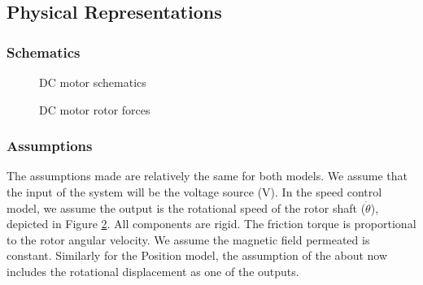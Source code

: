 \subsection{Physical Representations}
	\subsubsection{Schematics}
\begin{figure}[ht]
\centering
{}
\caption{\label{fig:dc1}DC motor schematics}
\end{figure}

\break
\begin{figure}[ht]
\centering
{}
\caption{\label{fig:dc2}DC motor rotor forces}
\end{figure}

	\subsubsection{Assumptions}
    The assumptions made are relatively the same for both models. We assume that the input of the system will be the voltage source (V). In the speed control model, we assume the output is the rotational speed of the rotor shaft ($\dot{\theta}$), depicted in Figure \ref{fig:dc2}. All components are rigid. The friction torque is proportional to the rotor angular velocity. We assume the magnetic field permeated is constant. Similarly for the Position model, the assumption of the about now includes the rotational displacement as one of the outputs.
